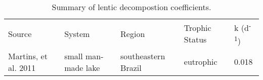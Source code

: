 \begin{table}
\label{tab:k_summary}
\begin{tabular}{ l l l l l }
Source               & System              & Region              & Trophic Status & k (d\textsuperscript{-1}) \\
Martins, et al. 2011 & small man-made lake & southeastern Brazil & eutrophic      & 0.018 \\



\end{tabular}
\caption{Summary of lentic decompostion coefficients.}
\end{table}